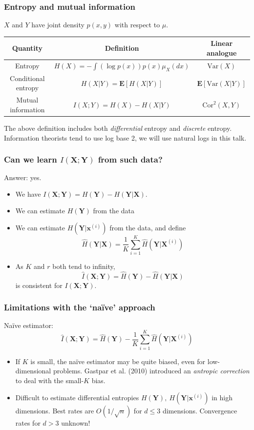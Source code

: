 \documentclass{beamer}
\newcommand{\bx}{\boldsymbol{x}}
\newcommand{\bX}{\boldsymbol{X}}
\newcommand{\bY}{\boldsymbol{Y}}
\newcommand{\E}{\textbf{E}}
\begin{document}
\begin{frame}
\frametitle{Entropy and mutual information}
$X$ and $Y$ have joint density $p(x, y)$ with respect to $\mu$.

\vspace{0.5in}

\begin{tabular}{c|c|c}
\hline
Quantity & Definition & Linear analogue\\\hline
Entropy & $H(X) = - \int (\log p(x)) p(x) \mu_X(dx)$ & $\text{Var}(X)$\\
Conditional entropy & $H(X|Y) = \E[H(X|Y)]$ & $\E[\text{Var}(X|Y)]$\\
Mutual information & $I(X;Y) = H(X) - H(X|Y)$ & $\text{Cor}^2(X, Y)$\\\hline
\end{tabular}

\vspace{0.3in}

\small{The above definition includes both \emph{differential} entropy and \emph{discrete} entropy.
Information theorists tend to use log base 2, we will use natural logs in this talk.}
\end{frame}

\begin{frame}
\frametitle{Can we learn $I(\bX; \bY)$ from such data?}
Answer: yes.
\begin{itemize}
\item We have $I(\bX; \bY) = H(\bY) - H(\bY|\bX)$.
\item We can estimate $H(\bY)$ from the data
\item We can estimate $H(\bY| \bx^{(i)})$ from the data, and define
\[
\hat{H}(\bY|\bX) = \frac{1}{K}\sum_{i=1}^K \hat{H}(\bY| \bX^{(i)})
\]
\item As $K$ and $r$ both tend to infinity,
\[
\hat{I}(\bX; \bY) = \hat{H}(\bY) - \hat{H}(\bY|\bX)
\]
is consistent for $I(\bX; \bY)$.
\end{itemize}
\end{frame}

\begin{frame}
\frametitle{Limitations with the `na\"{i}ve' approach}
Na\"{i}ve estimator:
\[
\hat{I}(\bX; \bY) = \hat{H}(\bY) - \frac{1}{K}\sum_{i=1}^K \hat{H}(\bY| \bX^{(i)})
\]
\begin{itemize}
\item If $K$ is small, the na\"{i}ve estimator may be quite biased, even for low-dimensional problems.
Gastpar et al. (2010) introduced an \emph{antropic correction} to deal with the small-$K$ bias.
\item Difficult to estimate differential entropies $H(\bY),\
  H(\bY|\bx^{(i)})$ in high dimensions.  Best rates are
  $O(1/\sqrt{n})$ for $d \leq 3$ dimensions.  Convergence rates for $d > 3$
  unknown!
\end{itemize}
\end{frame}
\end{document}
